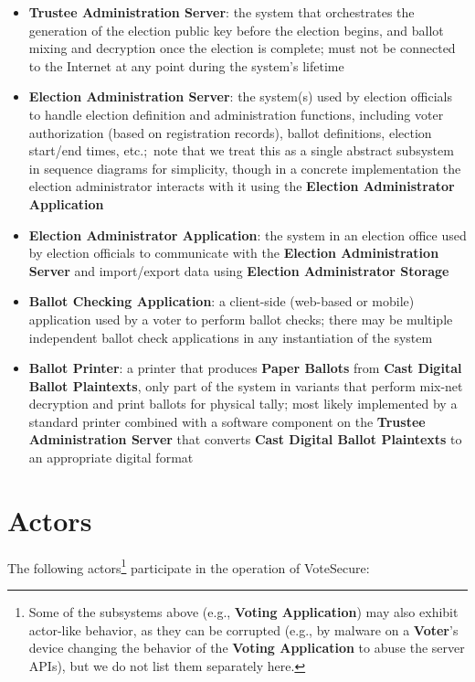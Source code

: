 \documentclass[10pt,letterpaper]{article}
\begin{document}
\begin{itemize}
    \item \textbf{Trustee Administration Server}: the system that orchestrates the generation of the election public key before the election begins, and ballot mixing and decryption once the election is complete; must not be connected to the Internet at any point during the system's lifetime

    \item \textbf{Election Administration Server}: the system(s) used by election officials to handle election definition and administration functions, including voter authorization (based on registration records), ballot definitions, election start/end times, etc.;~note that we treat this as a single abstract subsystem in sequence diagrams for simplicity, though in a concrete implementation the election administrator interacts with it using the \textbf{Election Administrator Application}

    \item \textbf{Election Administrator Application}: the system in an election office used by election officials to communicate with the \textbf{Election Administration Server} and import/export data using \textbf{Election Administrator Storage}

    \item \textbf{Ballot Checking Application}: a client-side (web-based or mobile) application used by a voter to perform ballot checks; there may be multiple independent ballot check applications in any instantiation of the system

    \item \textbf{Ballot Printer}: a printer that produces \textbf{Paper Ballots} from \textbf{Cast Digital Ballot Plaintexts}, only part of the system in variants that perform mix-net decryption and print ballots for physical tally; most likely implemented by a standard printer combined with a software component on the \textbf{Trustee Administration Server} that converts \textbf{Cast Digital Ballot Plaintexts} to an appropriate digital format

\end{itemize}

\pagebreak
\section{Actors}

The following actors\footnote{Some of the subsystems above (e.g., \textbf{Voting Application}) may also exhibit actor-like behavior, as they can be corrupted (e.g., by malware on a \textbf{Voter}'s device changing the behavior of the \textbf{Voting Application} to abuse the server APIs), but we do not list them separately here.} participate in the operation of VoteSecure:
\end{document}

